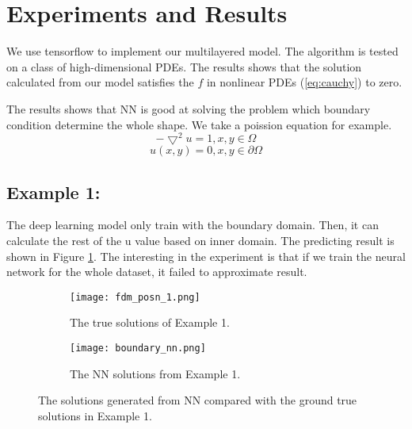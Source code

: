\documentclass{article}
\begin{document}
\section{Experiments and Results}

We use tensorflow to implement our multilayered model. The algorithm is tested on a class of high-dimensional PDEs. The results shows that the solution calculated from our model satisfies the $f$ in nonlinear PDEs (\ref{eq:cauchy}) to zero.

The results shows that NN is good at solving the problem which boundary condition determine the whole shape. We take a poission equation for example.
\[ -\bigtriangledown^{2} u = 1, x,y \in\Omega \]
\[u(x,y) = 0, x,y \in \partial \Omega \]

\subsection{Example 1: }
The deep learning model only train with the boundary domain.
Then, it can calculate the rest of the u value based on inner domain.
The predicting result is shown in Figure \ref{fig:fdm_posn_1}.
The interesting in the experiment is that if we train the neural network for the whole dataset, it failed to approximate result. 
\begin{figure}[h]
	\begin{subfigure}{0.5\textwidth}
		\texttt{[image: fdm\_posn\_1.png]}
		\caption{The true solutions of Example 1. }
	\end{subfigure}
	\begin{subfigure}{0.5\textwidth}
	\texttt{[image: boundary\_nn.png]}
	\caption{The NN solutions from Example 1.}
	\end{subfigure}	
   \caption{The solutions generated from NN compared with the ground true solutions in Example 1. }
	\label{fig:fdm_posn_1}
\end{figure}
\end{document}
